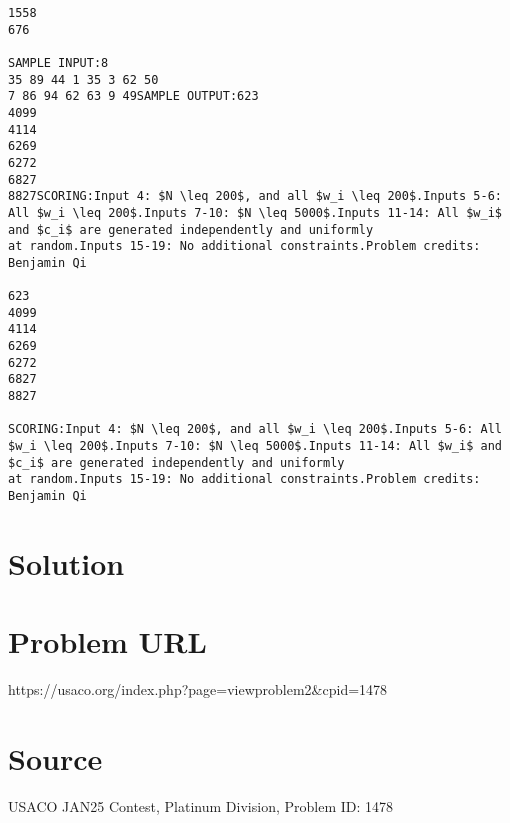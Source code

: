 \documentclass[12pt]{article}
\begin{document}
\begin{verbatim}
1558
676

SAMPLE INPUT:8
35 89 44 1 35 3 62 50
7 86 94 62 63 9 49SAMPLE OUTPUT:623
4099
4114
6269
6272
6827
8827SCORING:Input 4: $N \leq 200$, and all $w_i \leq 200$.Inputs 5-6: All $w_i \leq 200$.Inputs 7-10: $N \leq 5000$.Inputs 11-14: All $w_i$ and $c_i$ are generated independently and uniformly
at random.Inputs 15-19: No additional constraints.Problem credits: Benjamin Qi

623
4099
4114
6269
6272
6827
8827

SCORING:Input 4: $N \leq 200$, and all $w_i \leq 200$.Inputs 5-6: All $w_i \leq 200$.Inputs 7-10: $N \leq 5000$.Inputs 11-14: All $w_i$ and $c_i$ are generated independently and uniformly
at random.Inputs 15-19: No additional constraints.Problem credits: Benjamin Qi
\end{verbatim}

\section*{Solution}


\section*{Problem URL}
https://usaco.org/index.php?page=viewproblem2&cpid=1478

\section*{Source}
USACO JAN25 Contest, Platinum Division, Problem ID: 1478
\end{document}
